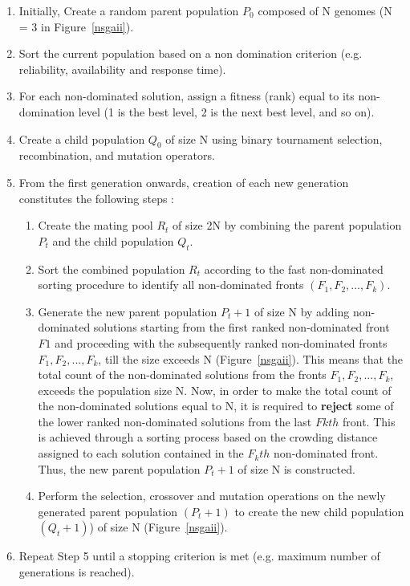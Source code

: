 \documentclass[conference]{IEEEtran}
\begin{document}
\begin{enumerate}
\item Initially, Create a random parent population $P_{0}$ composed of N genomes (N = 3 in Figure~\ref{nsgaii}).
\item Sort the current population based on a non domination criterion (e.g. reliability, availability and response time).
\item For each non-dominated solution, assign a fitness (rank) equal to its non-domination level (1 is the best level, 2 is the next best level, and so on).
\item Create a child population $Q_{0}$ of size N using binary tournament selection, recombination, and mutation operators.
\item From the first generation onwards, creation of each new generation constitutes the following steps :
	\begin{enumerate}	
	\item Create the mating pool $R_{t}$ of size 2N by combining the parent population $P_{t}$ and the child population $Q_{t}$.
	\item Sort the combined population $R_{t}$ according to the fast non-dominated sorting procedure to identify all non-dominated fronts $(F_{1} ,F_{2},...,F_{k})$.
	\item Generate the new parent population $P_{t}+1$ of size N by adding non-dominated solutions starting from the first ranked non-dominated front $F1$ and proceeding with the subsequently ranked non-dominated fronts $F_{1} ,F_{2}, . . . ,F_{k}$, till the size exceeds N (Figure~\ref{nsgaii}). This means that the total count of the non-dominated solutions from the fronts $F_{1} ,F_{2}, . . . ,F_{k}$, exceeds the population size N. Now, in order to make the total count of the non-dominated solutions equal to N, it is required to \textbf{reject} some of the lower ranked non-dominated solutions from the last $Fkth$ front. This is achieved through a sorting process based on the crowding distance assigned to each solution contained in the $F_{k}th$ non-dominated front. Thus, the new parent population $P_{t}+1$ of size N is constructed.
	\item Perform the selection, crossover and mutation operations on the newly generated parent population $(P_{t}+1)$ to create the new child population $(Q_{t}+1)$) of size N (Figure~\ref{nsgaii}).
	\end{enumerate}
\item Repeat Step 5 until a stopping criterion is met (e.g. maximum number of generations is reached).

\end{enumerate}
\end{document}
